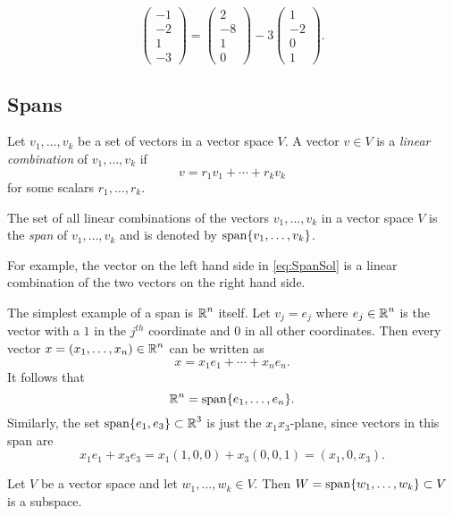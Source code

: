 \documentclass{ximera}
\begin{document}
\begin{equation}
\label{eq:SpanSol}
\left(\begin{array}{r} -1 \\ -2\\ 1\\ -3 \end{array}\right)
=
\left(\begin{array}{r} 2 \\ -8\\ 1\\ 0 \end{array}\right) -
3 \left(\begin{array}{r} 1 \\ -2\\ 0\\ 1 \end{array}\right).
\end{equation}


\subsection*{Spans}

Let $v_1,\ldots,v_k$ be a set of vectors in a vector space $V$.  A vector
$v\in V$ is a {\em linear combination\/} of $v_1,\ldots,v_k$
if
\[
v = r_1v_1 + \cdots + r_kv_k
\]
for some scalars $r_1,\ldots,r_k$.  


\begin{definition}  \label{span}
The set of all linear combinations of the vectors $v_1,\ldots,v_k$
in a vector space $V$ is the {\em span\/} of $v_1,\ldots,v_k$ and is
denoted by ${\rm span}\{v_1,\ldots,v_k\}$.
\end{definition} 

For example, the vector on the left hand side in \eqref{eq:SpanSol}
is a linear combination of the two vectors on the right hand side.

The simplest example of a span is $\mbox{$\Bbb{R}$}^n$ itself.  Let $v_j=e_j$
where $e_j\in\mbox{$\Bbb{R}$}^n$ is the vector with a $1$ in the $j^{th}$
coordinate and $0$ in all other coordinates.  Then every vector
$x=(x_1,\ldots,x_n)\in\mbox{$\Bbb{R}$}^n$ can be written as
\[
x = x_1e_1 + \cdots + x_ne_n.
\]
It follows that
\[
\mbox{$\Bbb{R}$}^n={\rm span}\{e_1,\ldots,e_n\}.
\]
Similarly, the set ${\rm span}\{e_1,e_3\}\subset\mbox{$\Bbb{R}$}^3$ is just the
$x_1x_3$-plane, since vectors in this span are
\[
x_1e_1+x_3e_3 = x_1(1,0,0) + x_3(0,0,1) = (x_1,0,x_3).
\]

\begin{proposition} \label{spansubspace} Let $V$ be a vector space and
let $w_1,\ldots,w_k\in V$. Then $W={\rm span}\{w_1,\ldots,w_k\}
\subset V$ is a subspace.
\end{proposition}  
\end{document}
